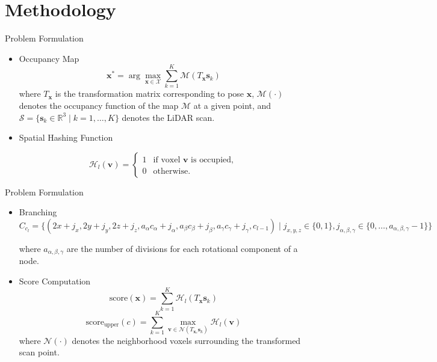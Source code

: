 \section{Methodology}

\begin{frame}{Problem Formulation}
\begin{itemize}

\item Occupancy Map
$$\mathbf{x}^* = \arg\max_{\mathbf{x} \in \mathcal{X}} \sum_{k=1}^{K} \mathcal{M}(T_{\mathbf{x}}\mathbf{s}_k)$$
where $T_{\mathbf{x}}$ is the transformation matrix corresponding to pose $\mathbf{x}$, $\mathcal{M}(\cdot)$ denotes the occupancy function of the map $\mathcal{M}$ at a given point, and $\mathcal{S} = \{\mathbf{s}_k \in \mathbb{R}^3 \mid k = 1, \dots, K\}$ denotes the LiDAR scan.

\item Spatial Hashing Function

\begin{equation*}
    \mathcal{H}_l(\mathbf{v}) =
    \begin{cases}
    1 & \text{if voxel } \mathbf{v} \text{ is occupied}, \\
    0 & \text{otherwise}.
    \end{cases}
\end{equation*}
\end{itemize}
\end{frame}

\begin{frame}{Problem Formulation}
\begin{itemize}

\item Branching
$C_{c_l} = \{ (2x + j_x, 2y + j_y, 2z + j_z, a_\alpha c_\alpha + j_\alpha, a_\beta c_\beta + j_\beta, a_\gamma c_\gamma + j_\gamma, c_{l-1}) \mid{} j_{x, y, z} \in \{0,1\}, j_{\alpha, \beta, \gamma} \in \{0, \ldots{}, a_{\alpha, \beta, \gamma} -1 \} \}
$

where $a_{\alpha, \beta, \gamma}$ are the number of divisions for each rotational component of a node.

\item Score Computation
$$\text{score}(\mathbf{x}) = \sum_{k=1}^{K} \mathcal{H}_l(T_{\mathbf{x}}\mathbf{s}_k)$$
$$\text{score}_{\text{upper}}(c) = \sum_{k=1}^{K} \max_{\mathbf{v} \in \mathcal{N}(T_{\mathbf{x}_c} \mathbf{s}_k)} \mathcal{H}_l(\mathbf{v})$$
where $\mathcal{N}(\cdot)$ denotes the neighborhood voxels surrounding the transformed scan point.

\end{itemize}
\end{frame}

